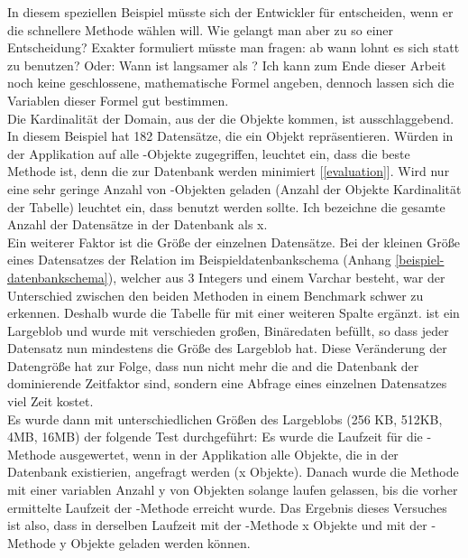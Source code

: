In diesem speziellen Beispiel müsste sich der Entwickler für  entscheiden, wenn er die schnellere Methode wählen will. Wie gelangt man aber zu so einer Entscheidung? Exakter formuliert müsste man fragen: ab wann lohnt es sich  statt  zu benutzen? Oder: Wann ist  langsamer als ? Ich kann zum Ende dieser Arbeit noch keine geschlossene, mathematische Formel angeben, dennoch lassen sich die Variablen dieser Formel gut bestimmen. \\
Die Kardinalität der Domain, aus der die Objekte kommen, ist ausschlaggebend. In diesem Beispiel hat  182 Datensätze, die ein Objekt repräsentieren. Würden in der Applikation auf alle -Objekte zugegriffen, leuchtet ein, dass  die beste Methode ist, denn die  zur Datenbank werden minimiert [\ref{evaluation}]. Wird nur eine sehr geringe Anzahl von -Objekten geladen (Anzahl der Objekte \mth{\ll} Kardinalität der Tabelle) leuchtet ein, dass  benutzt werden sollte. Ich bezeichne die gesamte Anzahl der Datensätze in der Datenbank als x.\\
Ein weiterer Faktor ist die Größe der einzelnen Datensätze. Bei der kleinen Größe eines Datensatzes der Relation  im Beispieldatenbankschema (Anhang \ref{beispiel-datenbankschema}), welcher aus 3 Integers und einem Varchar besteht, war der Unterschied zwischen den beiden Methoden in einem Benchmark schwer zu erkennen. Deshalb wurde die Tabelle für  mit einer weiteren Spalte  ergänzt.  ist ein Largeblob und wurde mit verschieden großen, Binäredaten befüllt, so dass jeder Datensatz nun mindestens die Größe des Largeblob hat. Diese Veränderung der Datengröße hat zur Folge, dass nun nicht mehr die  and die Datenbank der dominierende Zeitfaktor sind, sondern eine Abfrage eines einzelnen Datensatzes viel Zeit kostet. \\
Es wurde dann mit unterschiedlichen Größen des Largeblobs (256 KB, 512KB, 4MB, 16MB) der folgende Test durchgeführt: Es wurde die Laufzeit für die -Methode ausgewertet, wenn in der Applikation alle Objekte, die in der Datenbank existierien, angefragt werden (x Objekte). Danach wurde die  Methode mit einer variablen Anzahl y von Objekten solange laufen gelassen, bis die vorher ermittelte Laufzeit der -Methode erreicht wurde. Das Ergebnis dieses Versuches ist also, dass in derselben Laufzeit mit der -Methode x Objekte und mit der -Methode y Objekte geladen werden können. \\
